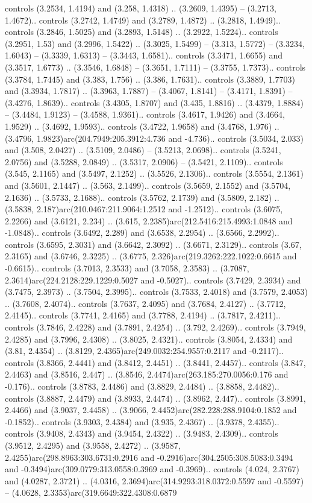 controls (3.2534, 1.4194) and (3.258, 1.4318) .. (3.2609, 1.4395) -- (3.2713, 1.4672).. controls (3.2742, 1.4749) and (3.2789, 1.4872) .. (3.2818, 1.4949).. controls (3.2846, 1.5025) and (3.2893, 1.5148) .. (3.2922, 1.5224).. controls (3.2951, 1.53) and (3.2996, 1.5422) .. (3.3025, 1.5499) -- (3.313, 1.5772) -- (3.3234, 1.6043) -- (3.3339, 1.6313) -- (3.3443, 1.6581).. controls (3.3471, 1.6655) and (3.3517, 1.6773) .. (3.3546, 1.6848) -- (3.3651, 1.7111) -- (3.3755, 1.7373).. controls (3.3784, 1.7445) and (3.383, 1.756) .. (3.386, 1.7631).. controls (3.3889, 1.7703) and (3.3934, 1.7817) .. (3.3963, 1.7887) -- (3.4067, 1.8141) -- (3.4171, 1.8391) -- (3.4276, 1.8639).. controls (3.4305, 1.8707) and (3.435, 1.8816) .. (3.4379, 1.8884) -- (3.4484, 1.9123) -- (3.4588, 1.9361).. controls (3.4617, 1.9426) and (3.4664, 1.9529) .. (3.4692, 1.9593).. controls (3.4722, 1.9658) and (3.4768, 1.976) .. (3.4796, 1.9823)arc(204.7949:205.3912:4.736 and -4.736).. controls (3.5034, 2.033) and (3.508, 2.0427) .. (3.5109, 2.0486) -- (3.5213, 2.0698).. controls (3.5241, 2.0756) and (3.5288, 2.0849) .. (3.5317, 2.0906) -- (3.5421, 2.1109).. controls (3.545, 2.1165) and (3.5497, 2.1252) .. (3.5526, 2.1306).. controls (3.5554, 2.1361) and (3.5601, 2.1447) .. (3.563, 2.1499).. controls (3.5659, 2.1552) and (3.5704, 2.1636) .. (3.5733, 2.1688).. controls (3.5762, 2.1739) and (3.5809, 2.182) .. (3.5838, 2.187)arc(210.0467:211.9064:1.2512 and -1.2512).. controls (3.6075, 2.2266) and (3.6121, 2.234) .. (3.615, 2.2385)arc(212.5416:215.4993:1.0848 and -1.0848).. controls (3.6492, 2.289) and (3.6538, 2.2954) .. (3.6566, 2.2992).. controls (3.6595, 2.3031) and (3.6642, 2.3092) .. (3.6671, 2.3129).. controls (3.67, 2.3165) and (3.6746, 2.3225) .. (3.6775, 2.326)arc(219.3262:222.1022:0.6615 and -0.6615).. controls (3.7013, 2.3533) and (3.7058, 2.3583) .. (3.7087, 2.3614)arc(224.2128:229.1229:0.5027 and -0.5027).. controls (3.7429, 2.3934) and (3.7475, 2.3973) .. (3.7504, 2.3995).. controls (3.7533, 2.4018) and (3.7579, 2.4053) .. (3.7608, 2.4074).. controls (3.7637, 2.4095) and (3.7684, 2.4127) .. (3.7712, 2.4145).. controls (3.7741, 2.4165) and (3.7788, 2.4194) .. (3.7817, 2.4211).. controls (3.7846, 2.4228) and (3.7891, 2.4254) .. (3.792, 2.4269).. controls (3.7949, 2.4285) and (3.7996, 2.4308) .. (3.8025, 2.4321).. controls (3.8054, 2.4334) and (3.81, 2.4354) .. (3.8129, 2.4365)arc(249.0032:254.9557:0.2117 and -0.2117).. controls (3.8366, 2.4441) and (3.8412, 2.4451) .. (3.8441, 2.4457).. controls (3.847, 2.4463) and (3.8516, 2.447) .. (3.8546, 2.4474)arc(263.185:270.0056:0.176 and -0.176).. controls (3.8783, 2.4486) and (3.8829, 2.4484) .. (3.8858, 2.4482).. controls (3.8887, 2.4479) and (3.8933, 2.4474) .. (3.8962, 2.447).. controls (3.8991, 2.4466) and (3.9037, 2.4458) .. (3.9066, 2.4452)arc(282.228:288.9104:0.1852 and -0.1852).. controls (3.9303, 2.4384) and (3.935, 2.4367) .. (3.9378, 2.4355).. controls (3.9408, 2.4343) and (3.9454, 2.4322) .. (3.9483, 2.4309).. controls (3.9512, 2.4295) and (3.9558, 2.4272) .. (3.9587, 2.4255)arc(298.8963:303.6731:0.2916 and -0.2916)arc(304.2505:308.5083:0.3494 and -0.3494)arc(309.0779:313.0558:0.3969 and -0.3969).. controls (4.024, 2.3767) and (4.0287, 2.3721) .. (4.0316, 2.3694)arc(314.9293:318.0372:0.5597 and -0.5597) -- (4.0628, 2.3353)arc(319.6649:322.4308:0.6879 